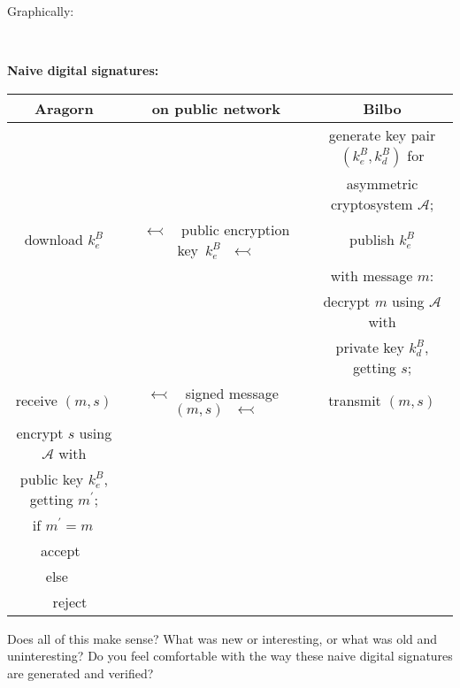 \documentclass[12pt,letterpaper]{amsbook}
\theoremstyle{definition}
\theoremstyle{remark}
\numberwithin{figure}{section}
\numberwithin{exercise}{chapter}
\numberwithin{section}{chapter}
\numberwithin{equation}{section}
\numberwithin{table}{subsection}
\newcommand{\ix}[1]{{#1}\index{#1}}
\newcommand{\Aa}{{\mathcal A}}
\begin{document}
Graphically:

\ \vskip2mm
\centerline{\large\textbf{Naive digital signatures:}}

\vskip3mm
\begin{adjustbox}{center}
 \begin{tabular}{|c|c|c|}
  \hline
  Aragorn & on public network & Bilbo\\
   \hline
   & & generate key pair $(k^B_e,k^B_d)$ for \\
   & & asymmetric cryptosystem $\Aa$; \\
   download $k^B_e$ & $\leftarrowtail\ \ \ $ public encryption key\index{encryption key [for an asymmetric cryptosystem]}\index{public key}\index{key!public}\index{key!encryption [for an asymmetric cryptosystem]}\ $k^B_e\ \ \ \leftarrowtail$ & publish $k^B_e$ \\
   \hline
   & & with message $m$: \\
   & & decrypt $m$ using $\Aa$ with \\
   & & private key $k^B_d$, getting $s$; \\
   receive $(m,s)$ & $\leftarrowtail\ \ \ $ signed message\ $(m,s)\ \ \ \leftarrowtail$ & transmit $(m,s)$ \\
   \hline
   encrypt $s$ using $\Aa$ with & & \\
   public key $k^B_e$, getting $m^\prime$; & & \\
   if $m^\prime=m$\qquad\qquad\, & &\\
   {\sc accept}\qquad\  & &\\
   else\qquad\qquad\qquad\ \ & &\\
   \ \ {\sc reject}\qquad\, & &\\
   \hline
 \end{tabular}
\end{adjustbox}

\vskip2mm
\begin{AZtcb}[label=az:naiveDS]{}{}
  Does all of this make sense?  What was new or interesting, or what was old
  and uninteresting?  Do you feel comfortable with the way these naive
  \ix{digital signature}s are generated and
  verified?
\end{AZtcb}
\end{document}
